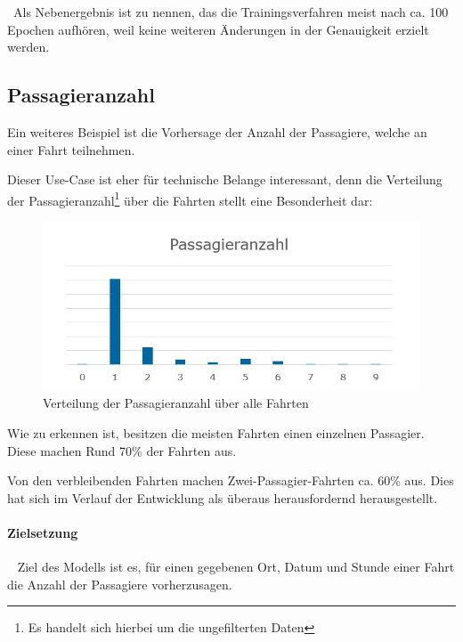 ~\newline Als Nebenergebnis ist zu nennen, das die Trainingsverfahren meist nach ca. 100 Epochen aufhören, weil keine weiteren Änderungen in der Genauigkeit erzielt werden.\newpage
\subsection{Passagieranzahl}
\label{sec:PasPred}
Ein weiteres Beispiel ist die Vorhersage der Anzahl der Passagiere, welche an einer Fahrt teilnehmen. 

Dieser Use-Case ist eher für technische Belange interessant, denn die Verteilung der Passagieranzahl\footnote{Es handelt sich hierbei um die ungefilterten Daten} über die Fahrten stellt eine Besonderheit dar: 


\begin{figure}[h]
	\begin{center}
		\includegraphics[width=0.8\linewidth]{Bilder/PassagierVerteilung}
		\caption[Verteilung der Passagieranzahl]{Verteilung der Passagieranzahl über alle Fahrten}
		\label{fig:PassagierVerteilung}
	\end{center}
\end{figure}


Wie zu erkennen ist, besitzen die meisten Fahrten einen einzelnen Passagier. Diese machen Rund 70\% der Fahrten aus.

Von den verbleibenden Fahrten machen Zwei-Passagier-Fahrten ca. 60\% aus.  Dies hat sich im Verlauf der Entwicklung als überaus herausfordernd herausgestellt. 
\paragraph{Zielsetzung} ~\newline
Ziel des Modells ist es, für einen gegebenen Ort, Datum und Stunde einer Fahrt die Anzahl der Passagiere vorherzusagen. 

